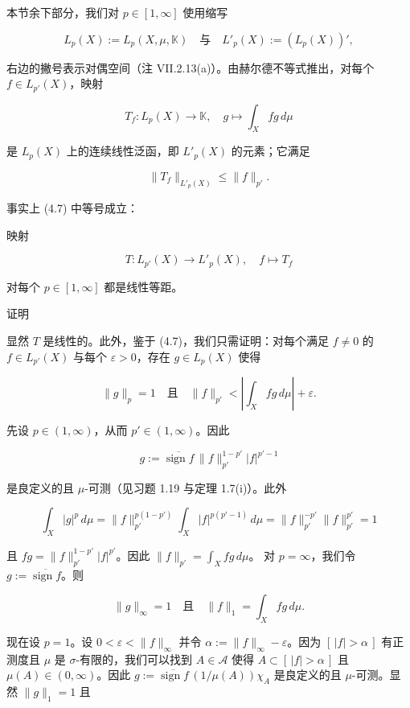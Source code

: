 本节余下部分，我们对 $ p \in [1, \infty] $ 使用缩写

\[
L_p(X) := L_p(X, \mu, \mathbb{K}) \quad \text{与} \quad L'_p(X) := (L_p(X))' ,
\]

右边的撇号表示对偶空间（注 VII.2.13(a)）。由赫尔德不等式推出，对每个 $ f \in L_{p'}(X) $，映射

\[
T_f : L_p(X) \to \mathbb{K} , \quad g \mapsto \int_X fg \, d\mu
\]

是 $ L_p(X) $ 上的连续线性泛函，即 $ L'_p(X) $ 的元素；它满足

\begin{equation}
\|T_f\|_{L'_p(X)} \le \|f\|_{p'} .\tag{4.7}
\end{equation}

事实上 (4.7) 中等号成立：

\begin{proposition}

映射

\[
T : L_{p'}(X) \to L'_p(X) , \quad f \mapsto T_f
\]

对每个 $ p \in [1, \infty] $ 都是线性等距。

证明

\begin{subitems}
\item

显然 $ T $ 是线性的。此外，鉴于 (4.7)，我们只需证明：对每个满足 $ f \ne 0 $ 的 $ f \in L_{p'}(X) $ 与每个 $ \varepsilon > 0 $，存在 $ g \in L_p(X) $ 使得

\[
\|g\|_p = 1 \quad \text{且} \quad \|f\|_{p'} < \left| \int_X fg \, d\mu \right| + \varepsilon .
\]
\item

先设 $ p \in (1, \infty) $，从而 $ p' \in (1, \infty) $。因此

\[
g := \overline{\operatorname{sign} f} \, \|f\|_{p'}^{1-p'} |f|^{p'-1}
\]

是良定义的且 $ \mu $-可测（见习题 1.19 与定理 1.7(i)）。此外

\[
\int_X |g|^p \, d\mu = \|f\|_{p'}^{p(1-p')} \int_X |f|^{p(p'-1)} \, d\mu = \|f\|_{p'}^{-p'} \|f\|_{p'}^{p'} = 1
\]

且 $ fg = \|f\|_{p'}^{1-p'} |f|^{p'} $。因此 $ \|f\|_{p'} = \int_X fg \, d\mu $。
对 $ p = \infty $，我们令 $ g := \overline{\operatorname{sign} f} $。则

\[
\|g\|_\infty = 1 \quad \text{且} \quad \|f\|_1 = \int_X fg \, d\mu .
\]
\item

现在设 $ p = 1 $。设 $ 0 < \varepsilon < \|f\|_\infty $ 并令 $ \alpha := \|f\|_\infty - \varepsilon $。因为 $ [\,|f| > \alpha\,] $ 有正测度且 $ \mu $ 是 $ \sigma $-有限的，我们可以找到 $ A \in \mathcal{A} $ 使得 $ A \subset [\,|f| > \alpha\,] $ 且 $ \mu(A) \in (0, \infty) $。因此 $ g := \overline{\operatorname{sign} f} \, (1/\mu(A)) \chi_A $ 是良定义的且 $ \mu $-可测。显然 $ \|g\|_1 = 1 $ 且


\end{subitems}
\end{proposition}
